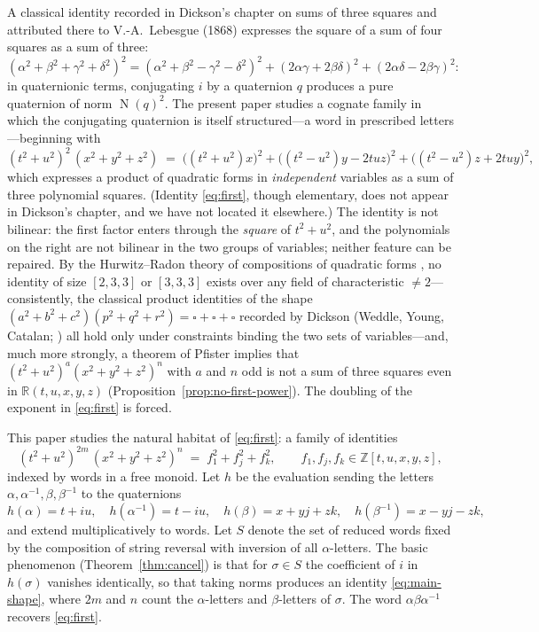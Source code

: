 \documentclass[11pt]{article}
\theoremstyle{definition}
\theoremstyle{remark}
\newcommand{\ZZ}{\mathbb{Z}}
\newcommand{\RR}{\mathbb{R}}
\DeclareMathOperator{\N}{N}
\begin{document}
A classical identity recorded in Dickson's chapter on sums of three squares \cite[Ch.~VII, p.~265]{Dickson} and attributed there to V.-A.~Lebesgue (1868) expresses the square of a sum of four squares as a sum of three:
\begin{equation}\label{eq:lebesgue}
(\alpha^2+\beta^2+\gamma^2+\delta^2)^2=(\alpha^2+\beta^2-\gamma^2-\delta^2)^2+(2\alpha\gamma+2\beta\delta)^2+(2\alpha\delta-2\beta\gamma)^2:
\end{equation}
in quaternionic terms, conjugating $i$ by a quaternion $q$ produces a pure quaternion of norm $\N(q)^2$. The present paper studies a cognate family in which the conjugating quaternion is itself structured---a word in prescribed letters---beginning with
\begin{equation}\label{eq:first}
(t^2+u^2)^2\,(x^2+y^2+z^2)\;=\;\bigl((t^2+u^2)x\bigr)^2+\bigl((t^2-u^2)y-2tuz\bigr)^2+\bigl((t^2-u^2)z+2tuy\bigr)^2,
\end{equation}
which expresses a product of quadratic forms in \emph{independent} variables as a sum of three polynomial squares. (Identity \eqref{eq:first}, though elementary, does not appear in Dickson's chapter, and we have not located it elsewhere.) The identity is not bilinear: the first factor enters through the \emph{square} of $t^2+u^2$, and the polynomials on the right are not bilinear in the two groups of variables; neither feature can be repaired. By the Hurwitz--Radon theory of compositions of quadratic forms \cite{Hurwitz, HurwitzMA, Radon, ShapiroBook, ShapiroSurvey}, no identity of size $[2,3,3]$ or $[3,3,3]$ exists over any field of characteristic $\ne 2$---consistently, the classical product identities of the shape $(a^2+b^2+c^2)(p^2+q^2+r^2)=\square+\square+\square$ recorded by Dickson (Weddle, Young, Catalan; \cite[Ch.~VII, pp.~263, 269]{Dickson}) all hold only under constraints binding the two sets of variables---and, much more strongly, a theorem of Pfister \cite{Pfister} implies that $(t^2+u^2)^{a}(x^2+y^2+z^2)^{n}$ with $a$ and $n$ odd is not a sum of three squares even in $\RR(t,u,x,y,z)$ (Proposition~\ref{prop:no-first-power}). The doubling of the exponent in \eqref{eq:first} is forced.

This paper studies the natural habitat of \eqref{eq:first}: a family of identities
\begin{equation}\label{eq:main-shape}
(t^2+u^2)^{2m}\,(x^2+y^2+z^2)^{n}\;=\;f_1^2+f_j^2+f_k^2,
\qquad f_1,f_j,f_k\in\ZZ[t,u,x,y,z],
\end{equation}
indexed by words in a free monoid. Let $h$ be the evaluation sending the letters $\alpha,\alpha^{-1},\beta,\beta^{-1}$ to the quaternions
\[
h(\alpha)=t+iu,\quad h(\alpha^{-1})=t-iu,\quad h(\beta)=x+yj+zk,\quad h(\beta^{-1})=x-yj-zk,
\]
and extend multiplicatively to words. Let $S$ denote the set of reduced words fixed by the composition of string reversal with inversion of all $\alpha$-letters. The basic phenomenon (Theorem~\ref{thm:cancel}) is that for $\sigma\in S$ the coefficient of $i$ in $h(\sigma)$ vanishes identically, so that taking norms produces an identity \eqref{eq:main-shape}, where $2m$ and $n$ count the $\alpha$-letters and $\beta$-letters of $\sigma$. The word $\alpha\beta\alpha^{-1}$ recovers \eqref{eq:first}.
\end{document}
